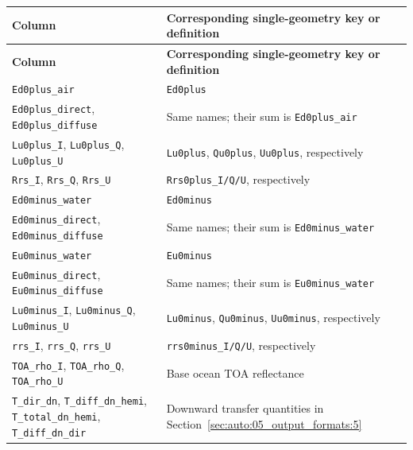 {\TableFont
\begin{longtable}{@{}>{\raggedright\arraybackslash}p{}>{\raggedright\arraybackslash}p{}@{}}
\toprule
\textbf{Column} & \textbf{Corresponding single-geometry key or definition} \\
\midrule
\endfirsthead
\toprule
\textbf{Column} & \textbf{Corresponding single-geometry key or definition} \\
\midrule
\endhead
\bottomrule
\endfoot
\texttt{Ed0plus\_\allowbreak{}air} & \texttt{Ed0plus} \\
\texttt{Ed0plus\_\allowbreak{}direct}, \texttt{Ed0plus\_\allowbreak{}diffuse} & Same names; their sum is \texttt{Ed0plus\_\allowbreak{}air} \\
\texttt{Lu0plus\_\allowbreak{}I}, \texttt{Lu0plus\_\allowbreak{}Q}, \texttt{Lu0plus\_\allowbreak{}U} & \texttt{Lu0plus}, \texttt{Qu0plus}, \texttt{Uu0plus}, respectively \\
\texttt{Rrs\_\allowbreak{}I}, \texttt{Rrs\_\allowbreak{}Q}, \texttt{Rrs\_\allowbreak{}U} & \texttt{Rrs0plus\_\allowbreak{}I/\allowbreak{}Q/\allowbreak{}U}, respectively \\
\texttt{Ed0minus\_\allowbreak{}water} & \texttt{Ed0minus} \\
\texttt{Ed0minus\_\allowbreak{}direct}, \texttt{Ed0minus\_\allowbreak{}diffuse} & Same names; their sum is \texttt{Ed0minus\_\allowbreak{}water} \\
\texttt{Eu0minus\_\allowbreak{}water} & \texttt{Eu0minus} \\
\texttt{Eu0minus\_\allowbreak{}direct}, \texttt{Eu0minus\_\allowbreak{}diffuse} & Same names; their sum is \texttt{Eu0minus\_\allowbreak{}water} \\
\texttt{Lu0minus\_\allowbreak{}I}, \texttt{Lu0minus\_\allowbreak{}Q}, \texttt{Lu0minus\_\allowbreak{}U} & \texttt{Lu0minus}, \texttt{Qu0minus}, \texttt{Uu0minus}, respectively \\
\texttt{rrs\_\allowbreak{}I}, \texttt{rrs\_\allowbreak{}Q}, \texttt{rrs\_\allowbreak{}U} & \texttt{rrs0minus\_\allowbreak{}I/\allowbreak{}Q/\allowbreak{}U}, respectively \\
\texttt{TOA\_\allowbreak{}rho\_\allowbreak{}I}, \texttt{TOA\_\allowbreak{}rho\_\allowbreak{}Q}, \texttt{TOA\_\allowbreak{}rho\_\allowbreak{}U} & Base ocean TOA reflectance \\
\texttt{T\_\allowbreak{}dir\_\allowbreak{}dn}, \texttt{T\_\allowbreak{}diff\_\allowbreak{}dn\_\allowbreak{}hemi}, \texttt{T\_\allowbreak{}total\_\allowbreak{}dn\_\allowbreak{}hemi}, \texttt{T\_\allowbreak{}diff\_\allowbreak{}dn\_\allowbreak{}dir} & Downward transfer quantities in Section~\ref{sec:auto:05_output_formats:5} \\

\end{longtable}}
